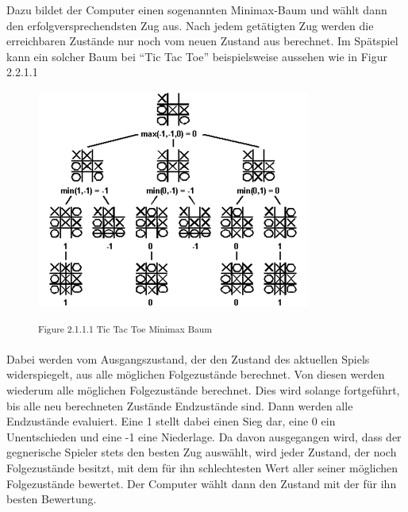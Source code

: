 
Dazu bildet der Computer einen sogenannten Minimax-Baum und wählt dann den erfolgversprechendsten Zug aus. Nach jedem getätigten Zug werden die erreichbaren Zustände nur noch vom neuen Zustand aus berechnet. Im Spätspiel kann ein solcher Baum bei ``Tic Tac Toe'' beispielsweise aussehen wie in Figur 2.2.1.1

\begin{figure}[h]
\centering
\includegraphics[width=\textwidth/5*3]{images/tictactoe_minimax_tree.png}

\textsuperscript{Figure 2.1.1.1 Tic Tac Toe Minimax Baum \cite{}}\\
\end{figure}

Dabei werden vom Ausgangszustand, der den Zustand des aktuellen Spiels widerspiegelt, aus alle möglichen Folgezustände berechnet. Von diesen werden wiederum alle möglichen Folgezustände berechnet. Dies wird solange fortgeführt, bis alle neu berechneten Zustände Endzustände sind. Dann werden alle Endzustände evaluiert. Eine 1 stellt dabei einen Sieg dar, eine 0 ein Unentschieden und eine -1 eine Niederlage. Da davon ausgegangen wird, dass der gegnerische Spieler stets den besten Zug auswählt, wird jeder Zustand, der noch Folgezustände besitzt, mit dem für ihn schlechtesten Wert aller seiner möglichen Folgezustände bewertet. Der Computer wählt dann den Zustand mit der für ihn besten Bewertung.

